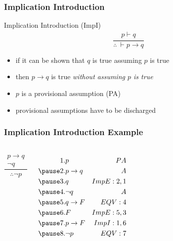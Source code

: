 \documentclass[dvipsnames]{beamer}
\begin{document}
\begin{frame}
  \frametitle{Implication Introduction}

  \begin{block}{Implication Introduction (ImpI)}
    \[
    \frac
      {
        \begin{array}{c}
          p \vdash q
        \end{array}
      }
      {
        \therefore ~ \vdash p \rightarrow q
      }
    \]
  \end{block}

  \begin{itemize}
    \item if it can be shown that $q$ is true assuming $p$ is true
    \item then $p \rightarrow q$ is true \emph{without assuming $p$ is true}

    \pause
    \medskip
    \item $p$ is a \alert{provisional assumption} (PA)
    \item provisional assumptions have to be \alert{discharged}
  \end{itemize}
\end{frame}

\begin{frame}
  \frametitle{Implication Introduction Example}

  \begin{columns}
    \[
    \frac
      {
        \begin{array}{c}
          p \rightarrow q\\
          \neg q
        \end{array}
      }
      {
        \therefore \neg p
      }
    \]

    \pause
    \begin{eqnarray*}
      1. & p               & PA\\
      \pause
      2. & p \rightarrow q & A\\
      \pause
      3. & q               & ImpE:2,1\\
      \pause
      4. & \neg q          & A\\
      \pause
      5. & q \rightarrow F & EQV:4\\
      \pause
      6. & F               & ImpE:5,3\\
      \pause
      7. & p \rightarrow F & ImpI:1,6\\
      \pause
      8. & \neg p          & EQV:7\\
    \end{eqnarray*}
  \end{columns}
\end{frame}
\end{document}
